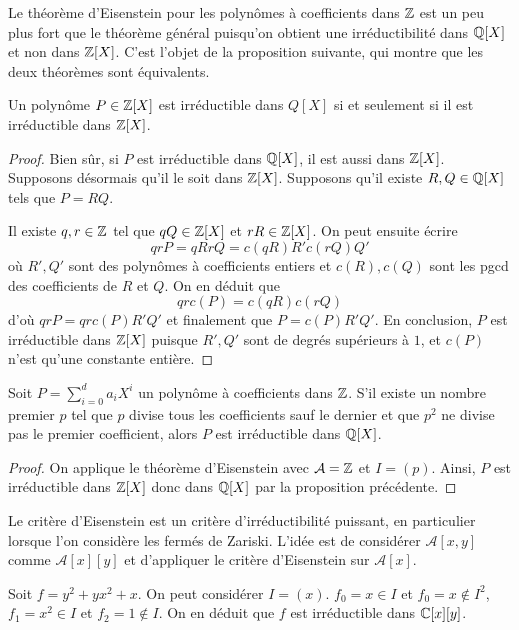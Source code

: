 \documentclass[../main.tex]{subfiles}
\begin{document}
Le théorème d'Eisenstein pour les polynômes à coefficients dans \(\mathbb{Z}\) est un peu plus fort que le théorème général puisqu'on obtient une irréductibilité dans \(\mathbb{Q}[X]\) et non dans \(\mathbb{Z}[X]\).
C'est l'objet de la proposition suivante, qui montre que les deux théorèmes sont équivalents.
\begin{proposition} Un polynôme \(P\in \mathbb{Z}[X]\) est irréductible dans \(Q[X]\) si et seulement si il est
    irréductible dans \(\mathbb{Z}[X]\).
\end{proposition}
\begin{proof} Bien sûr, si \(P\) est irréductible dans \(\mathbb{Q}[X]\), il est aussi dans \(\mathbb{Z}[X]\). Supposons désormais
    qu'il le soit dans \(\mathbb{Z}[X]\). Supposons qu'il existe \(R,Q\in \mathbb{Q}[X]\) tels que \(P = RQ\).

    Il existe \(q,r\in\mathbb{Z}\) tel que \(qQ\in \mathbb{Z}[X]\) et \(rR\in \mathbb{Z}[X]\). On peut ensuite écrire
    \begin{equation}
        qrP = qR rQ = c(qR)R'c(rQ)Q'
    \end{equation}
    où \(R',Q'\) sont des polynômes à coefficients entiers et \(c(R),c(Q)\) sont les pgcd des coefficients de \(R\) et \(Q\).
    On en déduit que 
    \begin{equation}
        qrc(P) = c(qR)c(rQ)
    \end{equation}
    d'où \(qrP = qrc(P)R'Q'\) et finalement que \(P = c(P)R'Q'\). En conclusion, \(P\) est irréductible dans \(\mathbb{Z}[X]\) puisque \(R',Q'\) sont de degrés supérieurs à \(1\),
    et \(c(P)\) n'est qu'une constante entière.
\end{proof}
\begin{corollary} Soit \(P = \sum_{i=0}^d a_i X^i\) un polynôme à coefficients dans \(\mathbb{Z}\).
    S'il existe un nombre premier \(p\) tel que \(p\) divise tous les coefficients sauf le dernier et que 
    \(p^2\) ne divise pas le premier coefficient, alors \(P\) est irréductible dans \(\mathbb{Q}[X]\).
\end{corollary}
\begin{proof} On applique le théorème d'Eisenstein avec \(\mathcal{A} = \mathbb{Z}\) et \(I = (p)\).
    Ainsi, \(P\) est irréductible dans \(\mathbb{Z}[X]\) donc dans \(\mathbb{Q}[X]\) par la proposition précédente.
\end{proof}
Le critère d'Eisenstein est un critère d'irréductibilité puissant, en particulier lorsque l'on 
considère les fermés de Zariski. L'idée est de considérer \(\mathcal{A}[x,y]\) comme \(\mathcal{A}[x][y]\) et d'appliquer le critère
d'Eisenstein sur \(\mathcal{A}[x]\).
\begin{example} Soit \(f = y^2 + yx^2 + x\). On peut considérer \(I = (x)\). \(f_0 = x \in I\) et \(f_0 = x \not\in I^2\), 
    \(f_1 = x^2 \in I\) et \(f_2 = 1 \not\in I\). On en déduit que \(f\) est irréductible dans \(\mathbb{C}[x][y]\).
\end{example}
\end{document}
